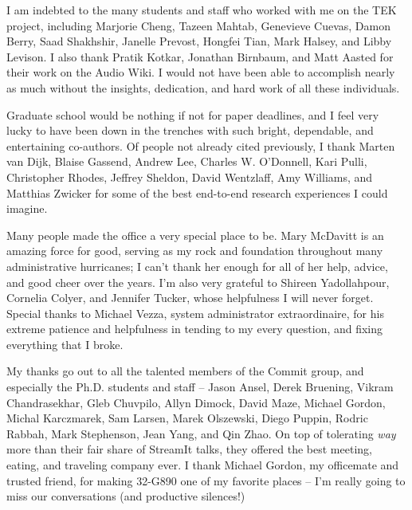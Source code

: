 I am indebted to the many students and staff who worked with me on
the TEK project, including Marjorie Cheng, Tazeen Mahtab, Genevieve
Cuevas, Damon Berry, Saad Shakhshir, Janelle Prevost, Hongfei Tian,
Mark Halsey, and Libby Levison.  I also thank Pratik Kotkar,
Jonathan Birnbaum, and Matt Aasted for their work on the Audio Wiki.
I would not have been able to accomplish nearly as much without the
insights, dedication, and hard work of all these individuals.

%

Graduate school would be nothing if not for paper deadlines, and I
feel very lucky to have been down in the trenches with such bright,
dependable, and entertaining co-authors.  Of people not already
cited previously, I thank Marten van Dijk, Blaise Gassend, Andrew
Lee, Charles W. O'Donnell, Kari Pulli, Christopher Rhodes, Jeffrey
Sheldon, David Wentzlaff, Amy Williams, and Matthias Zwicker for
some of the best end-to-end research experiences I could imagine.

Many people made the office a very special place to be.  Mary
McDavitt is an amazing force for good, serving as my rock and
foundation throughout many administrative hurricanes; I can't thank
her enough for all of her help, advice, and good cheer over the
years.  I'm also very grateful to Shireen Yadollahpour, Cornelia
Colyer, and Jennifer Tucker, whose helpfulness I will never forget.
Special thanks to Michael Vezza, system administrator
extraordinaire, for his extreme patience and helpfulness in tending
to my every question, and fixing everything that I broke.

My thanks go out to all the talented members of the Commit group,
and especially the Ph.D. students and staff -- Jason Ansel, Derek
Bruening, Vikram Chandrasekhar, Gleb Chuvpilo, Allyn Dimock, David
Maze, Michael Gordon, Michal Karczmarek, Sam Larsen, Marek
Olszewski, Diego Puppin, Rodric Rabbah, Mark Stephenson, Jean Yang,
and Qin Zhao.  On top of tolerating {\it way} more than their fair
share of StreamIt talks, they offered the best meeting, eating, and
traveling company ever.  I thank Michael Gordon, my officemate and
trusted friend, for making 32-G890 one of my favorite places -- I'm
really going to miss our conversations (and productive silences!)


